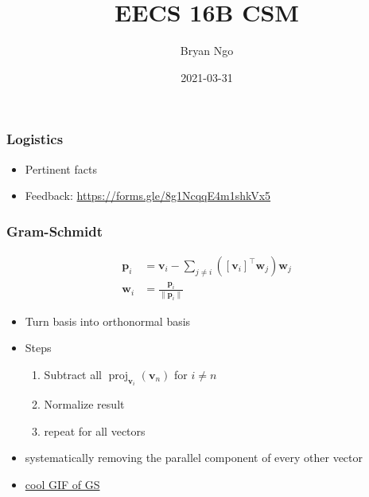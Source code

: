 \documentclass[aspectratio=169]{beamer}
\title{EECS 16B CSM}
\author{Bryan Ngo}
\date{2021-03-31}
\institute{UC Berkeley}
\newcommand{\tpose}[1]{\left[#1\right]^{\! \top} \!\!}
\begin{document}
\begin{frame}
    \maketitle
\end{frame}

\begin{frame}
    \frametitle{Logistics}

    \begin{itemize}
        \item Pertinent facts
        \item Feedback: \url{https://forms.gle/8g1NcqqE4m1shkVx5}
    \end{itemize}
\end{frame}

\begin{frame}
    \frametitle{Gram-Schmidt}

    \begin{align}
        \bm{p}_i &= \bm{v}_i - \sum_{j \neq i} (\tpose{\bm{v}_i} \bm{w}_j) \bm{w}_j \\
        \bm{w}_i &= \frac{\bm{p}_i}{\|\bm{p}_i\|}
    \end{align}

    \begin{itemize}
        \item Turn basis into orthonormal basis
        \item Steps
        \begin{enumerate}
            \item Subtract all \(\operatorname{proj}_{\bm{v}_i}(\bm{v}_n)\) for \(i \neq n\)
            \item Normalize result
            \item repeat for all vectors
        \end{enumerate}
        \item systematically removing the parallel component of every other vector
        \item \href{https://upload.wikimedia.org/wikipedia/commons/e/ee/Gram-Schmidt_orthonormalization_process.gif}{cool GIF of GS}
    \end{itemize}
\end{frame}
\end{document}
